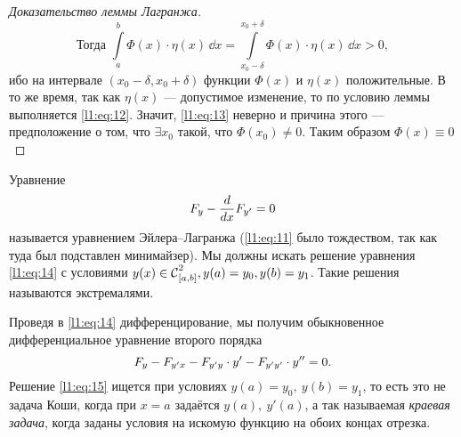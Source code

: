 \begin{proof}[Доказательство леммы Лагранжа]
\begin{tikzpicture}[x=0.75pt,y=0.75pt,yscale=-1,xscale=1]
		
	\end{tikzpicture}
	
	\begin{equation}
		\label{l1:eq:13}
		\text{Тогда }\int\limits_a^b \Phi(x)\cdot\eta(x)\,\dd{x}=\int\limits_{x_0-\delta}^{x_0+\delta} \Phi(x)\cdot\eta(x)\,\dd{x}>0,
	\end{equation}
	ибо на интервале $(x_0-\delta,x_0+\delta)$ функции $\Phi(x)$ и $\eta(x)$ положительные. В то же время, так как $\eta(x)$ --- допустимое изменение, то по условию леммы выполняется \eqref{l1:eq:12}. Значит, \eqref{l1:eq:13} неверно и причина этого --- предположение о том, что $\exists x_0$ такой, что $\Phi(x_0)\neq0$. Таким образом $\Phi(x)\equiv0$ 
\end{proof}

Уравнение
\begin{equation}
	\label{l1:eq:14}
	\hfill F_y-\der{}{x}F_{y'}=0\hfill
\end{equation} 
называется уравнением Эйлера--Лагранжа (\eqref{l1:eq:11} было тождеством, так как туда был подставлен минимайзер). Мы должны искать решение уравнения \eqref{l1:eq:14} с условиями $y(x)\in\Cfn[{[a,b]}]{2},\\ y(a)=y_0, y(b)=y_1$. Такие решения называются экстремалями.

Проведя в \eqref{l1:eq:14} дифференцирование, мы получим обыкновенное дифференциальное уравнение второго порядка 
\begin{equation}
	\label{l1:eq:15}
	\hfill F_y-F_{y'x}-F_{y'y}\cdot y'-F_{y'y'}\cdot y''=0.\hfill
\end{equation}
Решение \eqref{l1:eq:15} ищется при условиях $y(a)=y_0,\ y(b)=y_1$, то есть это не задача Коши, когда при $x=a$ задаётся $y(a),\ y'(a)$, а так называемая \emph{краевая задача}, когда заданы условия на искомую функцию на обоих концах отрезка.
\vspace{0.2cm}

